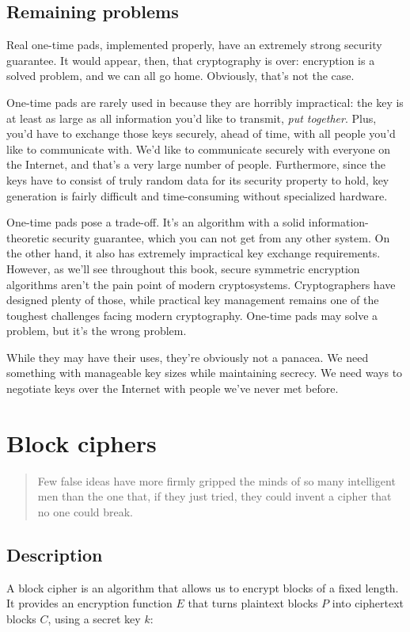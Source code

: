 \documentclass[11pt,ebook,table,dvipsnames]{memoir}
\begin{document}
\section{Remaining problems}
\label{sec-2-1-6}

Real one-time pads, implemented properly, have an extremely strong
security guarantee. It would appear, then, that cryptography is over:
encryption is a solved problem, and we can all go home. Obviously,
that's not the case.

One-time pads are rarely used in because they are horribly
impractical: the key is at least as large as all information you'd
like to transmit, \emph{put together}. Plus, you'd have to exchange those
keys securely, ahead of time, with all people you'd like to
communicate with. We'd like to communicate securely with everyone on
the Internet, and that's a very large number of people. Furthermore,
since the keys have to consist of truly random data for its security
property to hold, key generation is fairly difficult and
time-consuming without specialized hardware.

One-time pads pose a trade-off. It's an algorithm with a solid
information-theoretic security guarantee, which you can not get from
any other system. On the other hand, it also has extremely impractical
key exchange requirements. However, as we'll see throughout this book,
secure symmetric encryption algorithms aren't the pain point of modern
cryptosystems. Cryptographers have designed plenty of those, while
practical key management remains one of the toughest challenges facing
modern cryptography. One-time pads may solve a problem, but it's the
wrong problem.

While they may have their uses, they're obviously not a panacea. We
need something with manageable key sizes while maintaining secrecy. We
need ways to negotiate keys over the Internet with people we've never
met before.
\chapter{Block ciphers}
\label{sec-2-2}

\begin{quotation}
Few false ideas have more firmly gripped the minds of so many intelligent men
than the one that, if they just tried, they could invent a cipher that no one
could break.
\end{quotation}

\section{Description}
\label{sec-2-2-1}
A \gls{block cipher} is an algorithm that allows us to encrypt blocks
of a fixed length. It provides an encryption function $E$ that turns
plaintext blocks $P$ into ciphertext blocks $C$, using a secret key
$k$:
\end{document}
